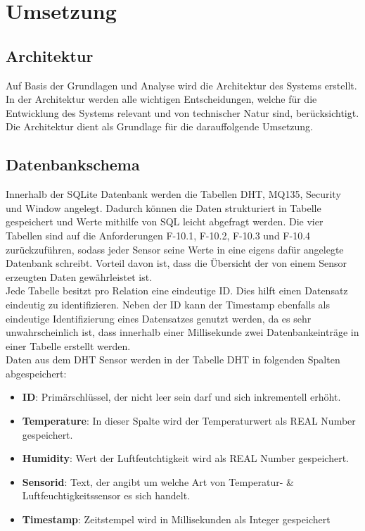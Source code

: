 \chapter{Umsetzung} \label{sec:Umsetzung}

\section{Architektur}
Auf Basis der Grundlagen und Analyse wird die Architektur des Systems erstellt.
In der Architektur werden alle wichtigen Entscheidungen, welche für die
Entwicklung des Systems relevant und von technischer Natur sind, berücksichtigt. Die Architektur dient als Grundlage für die darauffolgende Umsetzung.

\section{Datenbankschema}\label{db:DB}
Innerhalb der SQLite Datenbank werden die Tabellen DHT, MQ135, Security und Window angelegt. Dadurch können die Daten strukturiert in Tabelle gespeichert und Werte mithilfe von SQL leicht abgefragt werden. Die vier Tabellen sind auf die Anforderungen F-10.1, F-10.2, F-10.3 und F-10.4 zurückzuführen, sodass jeder Sensor seine Werte in eine eigens dafür angelegte Datenbank schreibt. Vorteil davon ist, dass die Übersicht der von einem Sensor erzeugten Daten gewährleistet ist.\\
Jede Tabelle besitzt pro Relation eine eindeutige ID. Dies hilft einen Datensatz eindeutig zu identifizieren. Neben der ID kann der Timestamp ebenfalls als eindeutige Identifizierung eines Datensatzes genutzt werden, da es sehr unwahrscheinlich ist, dass innerhalb einer Millisekunde zwei Datenbankeinträge in einer Tabelle erstellt werden.\\

Daten aus dem DHT Sensor werden in der Tabelle DHT in folgenden Spalten abgespeichert:
\begin{itemize}
	\item \textbf{ID}: Primärschlüssel, der nicht leer sein darf und sich inkrementell erhöht.  
	\item \textbf{Temperature}: In dieser Spalte wird der Temperaturwert als REAL Number gespeichert.
	\item \textbf{Humidity}: Wert der Luftfeutchtigkeit wird als REAL Number gespeichert.
	\item \textbf{Sensorid}: Text, der angibt um welche Art von Temperatur- \& Luftfeuchtigkeitssensor es sich handelt.
	\item \textbf{Timestamp}: Zeitstempel wird in Millisekunden als Integer gespeichert
\end{itemize}

